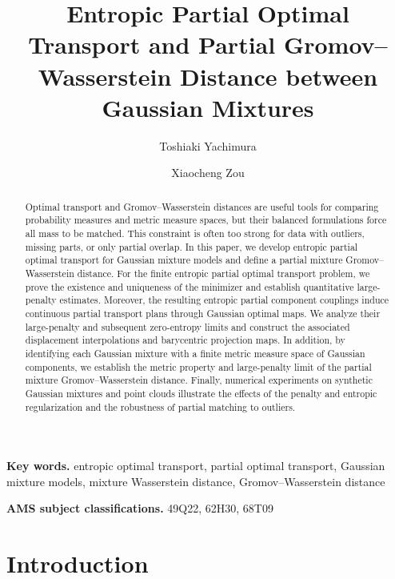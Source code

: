\documentclass[a4paper,11pt]{article}
\title{\bf Entropic Partial Optimal Transport and Partial Gromov--Wasserstein Distance between Gaussian Mixtures}
\author{Toshiaki Yachimura \and Xiaocheng Zou}
\date{}
\newenvironment{keywords}
{\par\vspace{.05in}\footnotesize\noindent\textbf{Key words. }\ignorespaces}
{\par\vspace{.1in}}
\newenvironment{AMS}
{\par\vspace{.05in}\footnotesize\noindent\textbf{AMS subject classifications. }\ignorespaces}
{\par\vspace{.1in}}
\numberwithin{equation}{section}
\begin{document}
\maketitle


\begin{abstract}
Optimal transport and Gromov--Wasserstein distances are useful tools for comparing probability measures and metric measure spaces, but their balanced formulations force all mass to be matched. This constraint is often too strong for data with outliers, missing parts, or only partial overlap. In this paper, we develop entropic partial optimal transport for Gaussian mixture models and define a partial mixture Gromov--Wasserstein distance. For the finite entropic partial optimal transport problem, we prove the existence and uniqueness of the minimizer and establish quantitative large-penalty estimates. Moreover, the resulting entropic partial component couplings induce continuous partial transport plans through Gaussian optimal maps. We analyze their large-penalty and subsequent zero-entropy limits and construct the associated displacement interpolations and barycentric projection maps. In addition, by identifying each Gaussian mixture with a finite metric measure space of Gaussian components, we establish the metric property and large-penalty limit of the partial mixture Gromov--Wasserstein distance. Finally, numerical experiments on synthetic Gaussian mixtures and point clouds illustrate the effects of the penalty and entropic regularization and the robustness of partial matching to outliers.
\end{abstract}


\begin{keywords} entropic optimal transport, partial optimal transport, Gaussian mixture models, mixture Wasserstein distance, Gromov--Wasserstein distance
\end{keywords}


\begin{AMS}
49Q22, 62H30, 68T09
\end{AMS}


\pagestyle{plain}
\thispagestyle{plain}



\section{Introduction}\label{sec:introduction}
\end{document}
